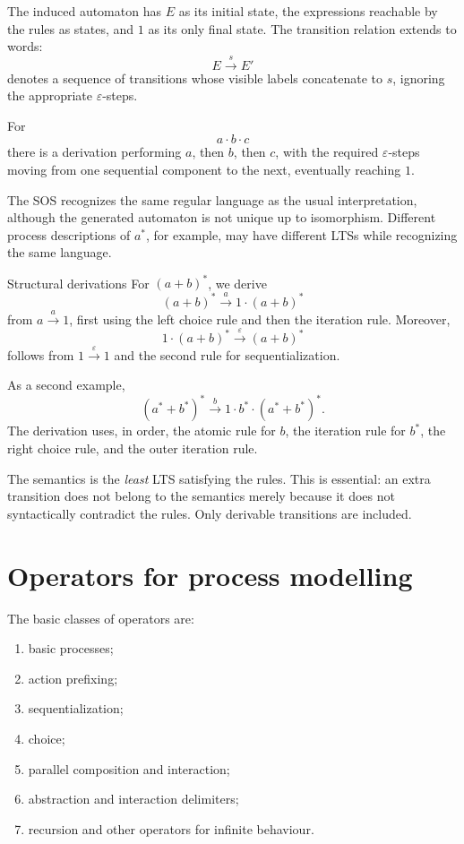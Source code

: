 \documentclass[a4paper]{article}
\newcommand{\eps}{\varepsilon}
\newcommand{\trans}[1]{\xrightarrow{#1}}
\begin{document}
The induced automaton has \(E\) as its initial state, the expressions reachable by the rules as states, and \(1\) as its only final state.
The transition relation extends to words:
\[
    E\trans{s}E'
\]
denotes a sequence of transitions whose visible labels concatenate to \(s\), ignoring the appropriate \(\eps\)-steps.

\begin{snippetexample}{}
    For
    \[
        a\cdot b\cdot c
    \]
    there is a derivation performing \(a\), then \(b\), then \(c\), with the required \(\eps\)-steps moving from one sequential component to the next, eventually reaching \(1\).
\end{snippetexample}

The SOS recognizes the same regular language as the usual interpretation, although the generated automaton is not unique up to isomorphism.
Different process descriptions of \(a^*\), for example, may have different LTSs while recognizing the same language.

\begin{snippetexample}{Structural derivations}
    For \((a+b)^*\), we derive
    \[
        (a+b)^*\trans{a}1\cdot(a+b)^*
    \]
    from \(a\trans{a}1\), first using the left choice rule and then the iteration rule.
    Moreover,
    \[
        1\cdot(a+b)^*\trans{\eps}(a+b)^*
    \]
    follows from \(1\trans{\eps}1\) and the second rule for sequentialization.

    As a second example,
    \[
        (a^*+b^*)^*
        \trans{b}
        1\cdot b^*\cdot(a^*+b^*)^*.
    \]
    The derivation uses, in order, the atomic rule for \(b\), the iteration rule for \(b^*\), the right choice rule, and the outer iteration rule.
\end{snippetexample}

The semantics is the \emph{least} LTS satisfying the rules.
This is essential: an extra transition does not belong to the semantics merely because it does not syntactically contradict the rules. Only derivable transitions are included.

\section{Operators for process modelling}

The basic classes of operators are:
\begin{enumerate}
    \item basic processes;
    \item action prefixing;
    \item sequentialization;
    \item choice;
    \item parallel composition and interaction;
    \item abstraction and interaction delimiters;
    \item recursion and other operators for infinite behaviour.
\end{enumerate}
\end{document}
